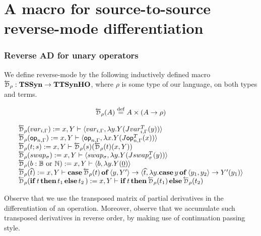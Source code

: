 \section{A macro for source-to-source reverse-mode differentiation}

\subsubsection{Reverse AD for unary operators} 

We define reverse-mode by the following inductively defined macro $\Dsynrevsymbol[\rho]:\TSSyn\to \TTSynHO$, where $\rho$ is some type of our language, on both types and terms.

\[
\begin{array}{l}
\Dsynrev[\rho]{A} \defeq A\times (A\To \rho)
\end{array}    
\]

\[
\begin{array}{l}
	 \Dsynrev[\rho]{var_{i,\Gamma}}:= \var,Y\vdash \tPair{var_{i,\Gamma}}{\lambda \var[2]. Y(Jvar_{i,\Gamma}^T(\var[2]))}\\
	 \Dsynrev[\rho]{\op_{n,\Gamma}}:= \var,Y\vdash \tPair{\op_{n,\Gamma}}{\lambda \var. Y(J\op_{n,\Gamma}^T(\var))}\\
	 \Dsynrev[\rho]{\trm;\trm[2]}:= \var,Y\vdash \Dsynrev[\rho]{\trm[2]}(\Dsynrev[\rho]{\trm}(\var,Y))\\
	 \Dsynrev[\rho]{swap_\sigma}:= \var,Y\vdash \tPair{swap_\sigma}{\lambda \var[2].Y(Jswap_\sigma^T(\var[2]))} \\
	 \Dsynrev[\rho]{b:\BB\text{ or }\NN}:= \var,Y\vdash \tPair{b}{\lambda \var[2].Y(\underline{0})}\\
	 \Dsynrev[\rho]{\widehat{\trm}}:= \var,Y\vdash \tMatch{\Dsynrev[\rho]{\trm}}{\var[2],Y'}{\tPair{\widehat{\trm}}{\lambda \var[2].\tMatch{\var[2]}{\var[2]_1,\var[2]_2}{Y'(\var[2]_1)}}}\\
	 \Dsynrev[\rho]{\ifelse{\trm}{\trm_1}{\trm_2}}:=\var,Y\vdash\ifelse{\trm}{\Dsynrev[\rho]{\trm_1}}{\Dsynrev[\rho]{\trm_2}}\\
\end{array}
\]

Observe that we use the transposed matrix of partial derivatives in the differentiation of an operation.
Moreover, observe that we accumulate such transposed derivatives in reverse order, by making use of continuation passing style.